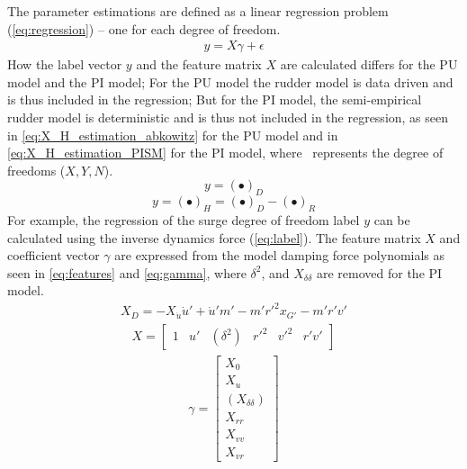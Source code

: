 The parameter estimations are defined as a linear regression problem (\autoref{eq:regression}) -- one for each degree of freedom. 
\begin{equation}\label{eq:regression}
\begin{split}y = X\gamma + \epsilon\end{split}
\end{equation}
How the label vector \(y\) and the feature matrix \(X\) are calculated differs for the PU model and the PI model; For the PU model the rudder model is data driven and is thus included in the regression; But for the PI model, the semi-empirical rudder model is deterministic and is thus not included in the regression, as seen in \autoref{eq:X_H_estimation_abkowitz} for the PU model and in \autoref{eq:X_H_estimation_PISM} for the PI model, where \textbullet\ represents the degree of freedoms ($X,Y,N$).
\begin{equation}
    \label{eq:X_H_estimation_abkowitz}
    y = (\bullet)_D
\end{equation}
\begin{equation}
    \label{eq:X_H_estimation_PISM}
    y = (\bullet)_H = (\bullet)_D - (\bullet)_R
\end{equation}
For example, the regression of the surge degree of freedom label \(y\) can be calculated using the inverse dynamics force (\autoref{eq:label}). 
The feature matrix \(X\) and coefficient vector $\gamma$ are expressed from the model damping force polynomials as seen in \autoref{eq:features} and \autoref{eq:gamma}, where $\delta^2$, and $X_{\delta\delta}$ are removed for the PI model.
\begin{equation}\label{eq:label}
\begin{split}\displaystyle X_D = - X_{\dot{u}} \dot{u}' + \dot{u}' m' - m' r'^{2} x_{G'} - m' r' v'\end{split}
\end{equation}
\begin{equation}\label{eq:features}
\begin{split}\displaystyle X = \left[\begin{matrix}1 & u' & (\delta^{2}) & r'^{2} & v'^{2} & r' v'\end{matrix}\right]\end{split}
\end{equation}
\begin{equation}\label{eq:gamma}
\begin{split}\displaystyle \gamma = \left[\begin{matrix}X_{0}\\X_{u}\\(X_{\delta\delta})\\X_{rr}\\X_{vv}\\X_{vr}\end{matrix}\right]\end{split}
\end{equation}

